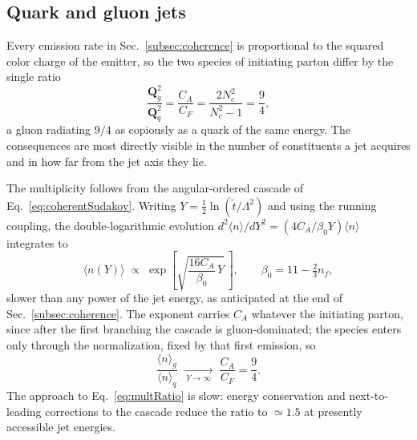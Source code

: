 \subsection{Quark and gluon jets}
\label{subsec:qgjets}

Every emission rate in Sec.~\ref{subsec:coherence} is proportional to the squared
color charge of the emitter, so the two species of initiating parton differ by the
single ratio
\begin{equation}
	\frac{\bm{Q}_g^2}{\bm{Q}_q^2} = \frac{C_A}{C_F}
	= \frac{2N_c^2}{N_c^2-1} = \frac{9}{4},
	\label{eq:casimirRatio}
\end{equation}
a gluon radiating \(9/4\) as copiously as a quark of the same energy. The
consequences are most directly visible in the number of constituents a jet acquires
and in how far from the jet axis they lie.

The multiplicity follows from the angular-ordered cascade of
Eq.~\ref{eq:coherentSudakov}. Writing \(Y=\tfrac12\ln(\tilde{t}/\Lambda^2)\) and using
the running coupling, the double-logarithmic evolution
\(d^2\langle n\rangle/dY^2 = (4C_A/\beta_0Y)\langle n\rangle\) integrates to
\begin{equation}
	\langle n(Y)\rangle \;\propto\;
	\exp\left[\sqrt{\frac{16C_A}{\beta_0}\,Y}\,\right],
	\qquad
	\beta_0 = 11-\tfrac{2}{3}n_f ,
	\label{eq:multiplicityGrowth}
\end{equation}
slower than any power of the jet energy, as anticipated at the end of
Sec.~\ref{subsec:coherence}. The exponent carries \(C_A\) whatever the initiating
parton, since after the first branching the cascade is gluon-dominated; the species
enters only through the normalization, fixed by that first emission, so
\begin{equation}
	\frac{\langle n\rangle_g}{\langle n\rangle_q}
	\;\xrightarrow[\;Y\to\infty\;]{}\; \frac{C_A}{C_F} = \frac{9}{4} .
	\label{eq:multRatio}
\end{equation}
The approach to Eq.~\ref{eq:multRatio} is slow: energy conservation and
next-to-leading corrections to the cascade reduce the ratio to \(\simeq1.5\) at
presently accessible jet energies.

